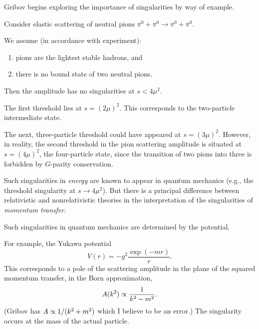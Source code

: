 \M
Gribov begins exploring the importance of singularities by way of
example.

\M[1]
Consider elastic scattering of neutral pions
$\pi^{0}+\pi^{0}\to\pi^{0}+\pi^{0}$.

 We assume (in accordance with experiment):
\begin{enumerate}
\item pions are the lightest stable hadrons, and
\item there is no bound state of two neutral pions.
\end{enumerate}

\M Then the amplitude has no singularities at $s<4\mu^{2}$.

\M
The first threshold lies at $s=(2\mu)^{2}$. This corresponds to the
two-particle intermediate state.

\M The next, three-particle threshold could have appeared at
$s=(3\mu)^{2}$.
However, in reality, the second threshold in the pion scattering
amplitude is situated at $s=(4\mu)^{2}$, the four-particle state, since
the transition of two pions into three is forbidden by $G$-parity
conservation.

Such singularities in \emph{energy} are known to appear in quantum
mechanics (e.g., the threshold singularity at $s\to 4\mu^{2}$).
But there is a principal difference between relativistic and
nonrelativistic theories in the interpretation of the singularities of
\emph{momentum transfer}.

 Such singularities in quantum mechanics are
determined by the potential.

 For example, the Yukawa potential
\begin{equation}
V(r)=-g^{2}\frac{\exp(- mr)}{r}.
\end{equation}
This corresponds to a pole of the scattering amplitude in the plane of
the squared momentum transfer, in the Born approximation,
\begin{equation}
A(k^{2})\propto\frac{1}{k^{2}-m^{2}}.
\end{equation}
(Gribov has $A\propto 1/(k^{2}+m^{2})$ which I believe to be an error.)
The singularity occurs at the mass of the actual particle.

